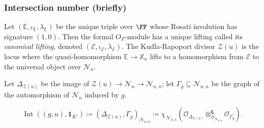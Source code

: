 \documentclass[11pt]{beamer}
\DeclareMathOperator{\Int}{Int}
\DeclareMathOperator{\Orb}{Orb}
\DeclareMathOperator{\U}{U}
\newcommand{\EE}{\mathbb{E}}
\newcommand{\HH}{\mathcal{H}}
\newcommand{\VV}{\mathbb{V}}
\newcommand{\XX}{\mathbb{X}}
\renewcommand{\OO}{O}
\newcommand{\RZ}{\mathcal{N}}
\newcommand{\Sheaf}{\mathcal O}
\newcommand{\ZD}{\mathcal{Z}}
\newcommand{\guv}{{(\gamma, \uu, \vv^\top)}}
\newcommand{\jiao}{\mathop{\otimes}^{\mathbf{L}}} %
\newcommand{\uu}{\mathbf{u}}
\newcommand{\vv}{\mathbf{v}}
\begin{document}

\begin{frame}
  \frametitle{Intersection number (briefly)}
  \begin{definition}
    Let $(\EE, \iota_\EE, \lambda_\EE)$ be the unique triple over $\FF$
    whose Rosati involution has signature $(1,0)$.
    Then the formal $\OO_F$-module has a unique lifting called its \emph{canonical lifting},
    denoted $(\mathcal{E}, \iota_{\mathcal{E}}, \lambda_{\mathcal E})$.
    The \alert{Kudla-Rapoport divisor $\ZD(u)$}
    is the locus where the quasi-homomorphism $\EE \to \XX_n$ lifts to a homomorphism
    from $\mathcal{E}$ to the universal object over $\RZ_n$.
  \end{definition}
  Let $\Delta_{\ZD(u)}$ be the image of $\ZD(u) \to \RZ_n \to \RZ_{n,n}$;
  let $\Gamma_g \subseteq \RZ_{n,n}$ be the graph of the automorphism of $\RZ_n$ induced by $g$.
  \begin{definition}
    \[
      \Int((g,u), \mathbf{1}_{K'})
      \coloneqq \left( \Delta_{\ZD(u)}, \Gamma_g \right)_{\RZ_{n,n}}
      \coloneqq \chi_{\RZ_{n,n}}
      \left( \Sheaf_{\Delta_{\ZD(u)}} \jiao_{\Sheaf_{\RZ_{n,n}}} \Sheaf_{\Gamma_g}  \right).
    \]
  \end{definition}
\end{frame}
\end{document}
